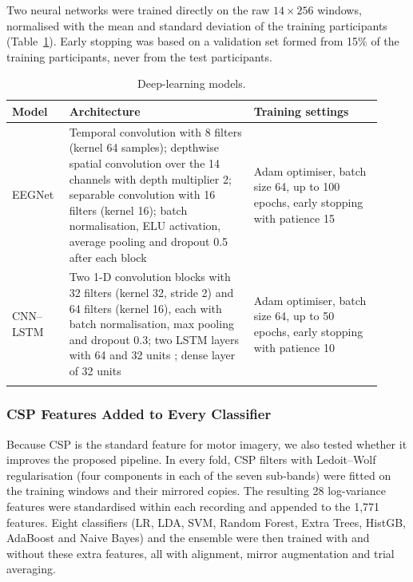 \documentclass[pdflatex,sn-mathphys-num]{sn-jnl}%
\theoremstyle{thmstyleone}%
\theoremstyle{thmstyletwo}%
\theoremstyle{thmstylethree}%
\begin{document}
Two neural networks were trained directly on the raw $14 \times 256$ windows, normalised with the mean and standard deviation of the training participants (Table~\ref{tab:dlmodels}). Early stopping was based on a validation set formed from 15\% of the training participants, never from the test participants.

\begin{table}[htbp]
\centering
\caption{Deep-learning models.}
\label{tab:dlmodels}
\footnotesize
\begin{tabular}{@{}p{0.14\linewidth}p{0.46\linewidth}p{0.32\linewidth}@{}}
\toprule
\textbf{Model} & \textbf{Architecture} & \textbf{Training settings} \\
\midrule
EEGNet \citep{Lawhern2018} & Temporal convolution with 8 filters (kernel 64 samples); depthwise spatial convolution over the 14 channels with depth multiplier 2; separable convolution with 16 filters (kernel 16); batch normalisation, ELU activation, average pooling and dropout 0.5 after each block & Adam optimiser, batch size 64, up to 100 epochs, early stopping with patience 15 \\ \addlinespace
CNN--LSTM & Two 1-D convolution blocks with 32 filters (kernel 32, stride 2) and 64 filters (kernel 16), each with batch normalisation, max pooling and dropout 0.3; two LSTM layers with 64 and 32 units \citep{HochreiterSchmidhuber1997}; dense layer of 32 units & Adam optimiser, batch size 64, up to 50 epochs, early stopping with patience 10 \\
\botrule
\end{tabular}
\end{table}

\subsubsection{CSP Features Added to Every Classifier}\label{subsec:cspadd}

Because CSP is the standard feature for motor imagery, we also tested whether it improves the proposed pipeline. In every fold, CSP filters with Ledoit--Wolf regularisation (four components in each of the seven sub-bands) were fitted on the training windows and their mirrored copies. The resulting 28 log-variance features were standardised within each recording and appended to the 1,771 features. Eight classifiers (LR, LDA, SVM, Random Forest, Extra Trees, HistGB, AdaBoost and Naive Bayes) and the ensemble were then trained with and without these extra features, all with alignment, mirror augmentation and trial averaging.
\end{document}

